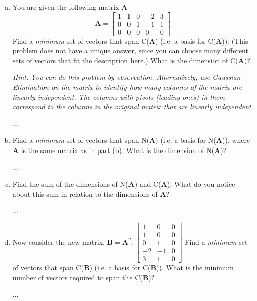 \documentclass[11pt]{article}
\def\A{\textbf{A}} %
\def\B{\textbf{B}}
\begin{document}
\begin{enumerate}
\begin{enumerate}[(a)]
	      	\item You are given the following matrix $\A$
	      	      \[
	      	      	\A = \begin{bmatrix}
	      	      	1 & 1 & 0 & -2 & 3 \\
	      	      	0 & 0 & 1 & -1 & 1 \\
	      	      	0 & 0 & 0 & 0 & 0
	      	      	\end{bmatrix}
	      	      \]
	      	      Find a \textit{minimum} set of vectors that span C($\A$) (i.e. a basis for C($\A$)). (This problem does not have a unique answer, since you can choose many different sets of vectors that fit the description here.) What is the dimension of C($\A$)?
	      	      	        
	      	      \textit{Hint: You can do this problem by observation. Alternatively, use Gaussian Elimination on the matrix to identify how many columns of the matrix are linearly independent. The columns with pivots (leading ones) in them correspond to the columns in the original matrix that are linearly independent}.
	      	      \begin{Answer}
	      	      	...
	      	      \end{Answer}
	      	      	        
	      	      \newpage
	      	      	        
	      	\item Find a \textit{minimum} set of vectors that span N($\A$) (i.e. a basis for N($\A$)), where $\A$ is the same matrix as in part (b). What is the dimension of N($\A$)?
	      	      \begin{Answer}
	      	      	...
	      	      \end{Answer}
	      	      	        
	      	      \newpage
	      	\item Find the sum of the dimensions of N($\A$) and C($\A$). What do you notice about this sum in relation to the dimensions of $\A$?
	      	      \begin{Answer}
	      	      	...
	      	      \end{Answer}
	      	      	        
	      	      \newpage
	      	      	        
	      	\item Now consider the new matrix, $\B = \A^{T}, \begin{bmatrix}
	      	      1 & 0 & 0 \\
	      	      1 & 0 & 0 \\
	      	      0 & 1 & 0 \\
	      	      -2 & -1 & 0 \\
	      	      3 & 1 & 0
	      	\end{bmatrix}$
	      	Find a \textit{minimum} set of vectors that span C($\B$) (i.e. a basis for C($\B$)). What is the minimum number of vectors required to span the C($\B$)?
	      	\begin{Answer}
	      		...
	      	\end{Answer}
	      		        

\end{enumerate}
\end{enumerate}
\end{document}
